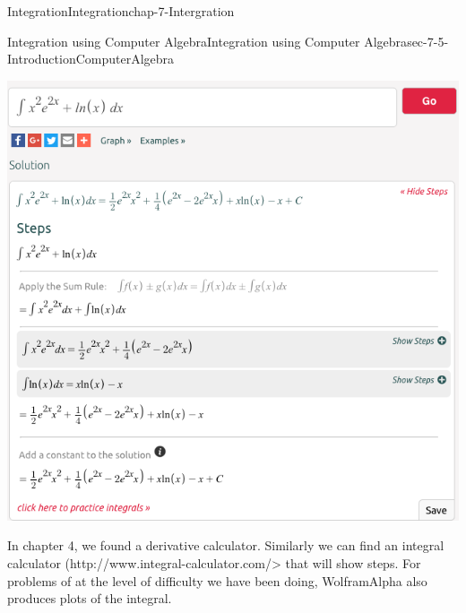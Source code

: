 \documentclass[oneside,10pt,]{book}
\numberwithin{equation}{section}
\begin{document}
\begin{chapterptx}{Integration}{}{Integration}{}{}{chap-7-Intergration}
\begin{sectionptx}{Integration using Computer Algebra}{}{Integration using Computer Algebra}{}{}{sec-7-5-IntroductionComputerAlgebra}
\begin{sidebyside}{1}{0.05}{0.05}{0}%
\begin{sbspanel}{0.9}%
\includegraphics[width=1\linewidth]{images/sec7-5-9.png}
\end{sbspanel}%
\end{sidebyside}%
\par
\hypertarget{p-2891}{}%
In chapter 4, we found a derivative calculator.  Similarly we can find an integral calculator (http:\slash{}\slash{}www.integral-calculator.com\slash{}\textgreater{}  that will show steps. For problems of at the level of difficulty we have been doing, Wolfram\textbar{}Alpha also produces plots of the integral.%
\begin{sidebyside}{1}{0.05}{0.05}{0}%
\begin{sbspanel}{0.9}%

\end{sbspanel}
\end{sidebyside}
\end{sectionptx}
\end{chapterptx}
\end{document}
